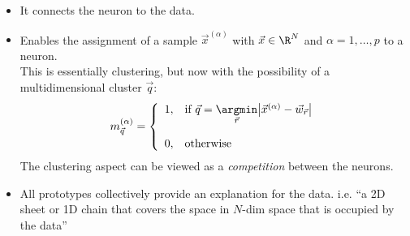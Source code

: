 \begin{frame}%


\pause

\begin{itemize}
\item It connects the neuron to the data.
\item Enables the assignment of a sample $\vec x^{(\alpha)}$ with $\vec x \in \R^N$ and $\alpha = 1,\ldots,p$ to a neuron.\\
This is essentially clustering, but now with the possibility of a multidimensional cluster $\vec q$: \\
\begin{equation}
	m_{\vec{q}}^{(\alpha)} = \left\{ \begin{array}{ll}
		1, & \text{if } \vec q = \underset{\vec r}{\argmin} \big| \vec{x}^{(\alpha)}
			-\vec{w}_{\vec r} \big| \\\\
		0, & \text{otherwise}
	\end{array} \right.
\end{equation}
The clustering aspect can be viewed as a \emph{competition} between the neurons.
\item All prototypes collectively provide an explanation for the data. i.e. ``a 2D sheet or 1D chain that covers the space in $N$-dim space that is occupied by the data''
\end{itemize}

\end{frame}




